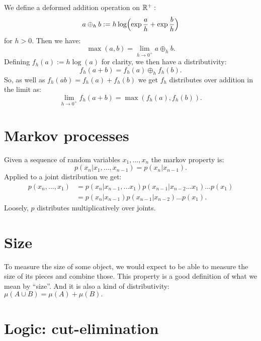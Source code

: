 \documentclass[11pt]{article}
\begin{document}
We define a deformed addition operation on $\mathbb R^{+}:$
$$
    a\oplus_h b := h\log \Bigl( \exp\frac{a}{h} +\exp\frac{b}{h} \Bigr)
$$
for $h>0.$
Then we have:
$$
    \max(a, b) = \lim_{h\to 0^+} a\oplus_h b.
$$
Defining $f_h(a) := h\log(a)$ for clarity, we then
have a distributivity:
$$
    f_h(a+b) = f_h(a) \oplus_h f_h(b).
$$
So, as well as $f_h(ab) = f_h(a) + f_h(b)$ we
get $f_h$ distributes over addition in the limit as:
$$
    \lim_{h\to 0^+} f_h(a+b) = \max(f_h(a), f_h(b)).
$$



%
%

\section{Markov processes}

Given a sequence of random variables $x_1,...,x_n$
the markov property is:
$$
    p(x_n|x_1,...,x_{n-1}) = p(x_n|x_{n-1}).
$$
Applied to a joint distribution we get:
\begin{align*}
    p(x_n,...,x_1) &= p(x_n|x_{n-1},...x_1) p(x_{n-1}|x_{n-2}...x_1)...p(x_1)\\
                    &= p(x_n|x_{n-1}) p(x_{n-1}|x_{n-2})...p(x_1).
\end{align*}
Loosely, $p$ distributes multiplicatively over joints.


%
%

\section{Size}

To measure the size of some object, we would
expect to be able to measure the size of its pieces
and combine those. 
This property is a good definition of what we
mean by ``size''. And it is also a kind of
distributivity: $\mu(A\cup B) = \mu(A) + \mu(B).$


%
%

\section{Logic: cut-elimination}
\end{document}
